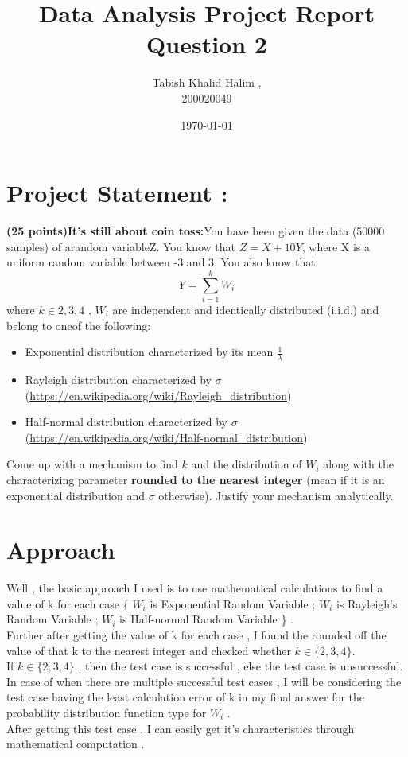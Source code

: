 \documentclass{article}
\title{Data Analysis Project Report \\ Question 2}
\date{\today}
\author{Tabish Khalid Halim , \\ 200020049}
\affil{Department of Computer Science, IIT Dharwad}
\begin{document}
\maketitle
{}
\newpage
\tableofcontents

\newpage
{}
\section*{Project Statement :}
\textbf{(25 points)It’s still about coin toss:}You have been given the data (50000 samples) of arandom  variableZ.   You  know  that $Z=X+ 10Y$,  where X is a uniform  random  variable between -3 and 3.  You also know that 
$$ Y = \sum_{i = 1}^{k} W_i $$
where $ k \in {2,3,4}$ , $W_i$ are independent and identically distributed (i.i.d.)  and belong to oneof the following:
\begin{itemize}
    \item Exponential distribution characterized by its mean $ \frac{1}{\lambda} $
    \item Rayleigh distribution characterized by $\sigma$ \\ (\url{https://en.wikipedia.org/wiki/Rayleigh_distribution})
    \item Half-normal distribution characterized by $\sigma$ \\ (\url{https://en.wikipedia.org/wiki/Half-normal_distribution})
\end{itemize}    
Come up with a mechanism to find $k$ and the distribution of $W_i$ along with the characterizing parameter \textbf{rounded to the nearest integer} (mean if it is an exponential distribution and $\sigma$ otherwise).  Justify your mechanism analytically.
\vspace{20pt}
\section{Approach}
Well , the basic approach I used is to use mathematical calculations to find a value of k for each case \{ $W_i$ is Exponential Random Variable ; $W_i$ is Rayleigh's Random Variable ; $W_i$ is Half-normal Random Variable \} .
\vspace{10pt}
\\
Further after getting the value of k for each case , I found the rounded off the value of that k to the nearest integer and checked whether $k \in \{2,3,4\} $.
\vspace{10pt}
\\If $k \in \{ 2,3,4\}  $ , then the {\color{cyan} test case} is {\color{green}successful} , else the {\color{cyan} test case} is {\color{red}unsuccessful}.
\vspace{10pt}
\\In case of when there are multiple {\color{green}successful} test cases , I will be considering the test case having the least calculation error of k 
in my final answer for the probability distribution function type for $W_i$ .
\vspace{10pt}
\\After getting this test case , I can easily get it's characteristics through mathematical computation .
\newpage
\end{document}
